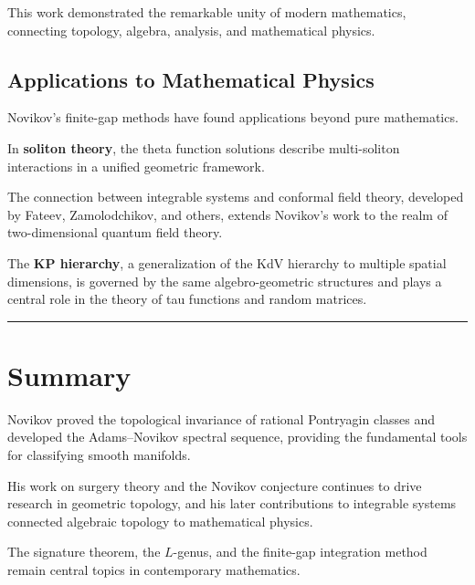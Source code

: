 This work demonstrated the remarkable unity of modern mathematics, connecting topology, algebra, analysis, and mathematical physics.

\subsection*{Applications to Mathematical Physics}

Novikov's finite-gap methods have found applications beyond pure mathematics.

In \textbf{soliton theory}, the theta function solutions describe multi-soliton interactions in a unified geometric framework.

The connection between integrable systems and conformal field theory, developed by Fateev, Zamolodchikov, and others, extends Novikov's work to the realm of two-dimensional quantum field theory.

The \textbf{KP hierarchy}, a generalization of the KdV hierarchy to multiple spatial dimensions, is governed by the same algebro-geometric structures and plays a central role in the theory of tau functions and random matrices.

\begin{center}\rule{0.5\linewidth}{0.5pt}\end{center}

\section*{Summary}

Novikov \cite{novikov1960} proved the topological invariance of rational Pontryagin classes and developed the Adams--Novikov spectral sequence, providing the fundamental tools for classifying smooth manifolds.

His work on surgery theory and the Novikov conjecture continues to drive research in geometric topology, and his later contributions to integrable systems connected algebraic topology to mathematical physics.

The signature theorem, the $L$-genus, and the finite-gap integration method remain central topics in contemporary mathematics.
